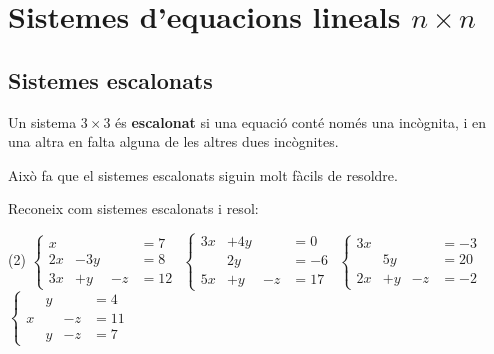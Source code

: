 \section{Sistemes d'equacions lineals $n\times n$}

\subsection{Sistemes escalonats}
\begin{theorybox}
	Un sistema $3\times 3$ és \textbf{escalonat} si una equació conté només una incògnita, i en una altra en falta alguna de les altres dues incògnites.
	
	Això fa que el sistemes escalonats siguin molt fàcils de resoldre.
\end{theorybox}
\begin{mylist}
	 
\exer[1] Reconeix com sistemes escalonats i resol: 
\begin{tasks}(2)
	\task  $\left\{\begin{array}{llll} x &  & & =7 \\ 2x& -3y & &=8 \\ 3x& +y& -z&=12 \end{array}\right. $       
	\task  $\left\{\begin{array}{llll} 3x&+4y&&=0 \\ &2y&&=-6 \\ 5x&+y&-z&=17 \end{array}\right. $ 
	\task  $\left\{\begin{array}{llll} 3x&&&=-3 \\ &5y&&=20 \\ 2x&+y&-z&=-2 \end{array}\right. $        
	\task  $\left\{\begin{array}{llll} &y&&=4 \\ x&&-z&=11 \\ &y&-z&=7 \end{array}\right. $ 
\end{tasks}
\answers[cols=1]{[
		 $x=7; y=2; z=11$, 
		 $x=4; y=-3; z=0$, 
		 $x=-1; y=4; z=4$, 
		 $x=8; y=4; z=-3$ ]}


\end{mylist}
